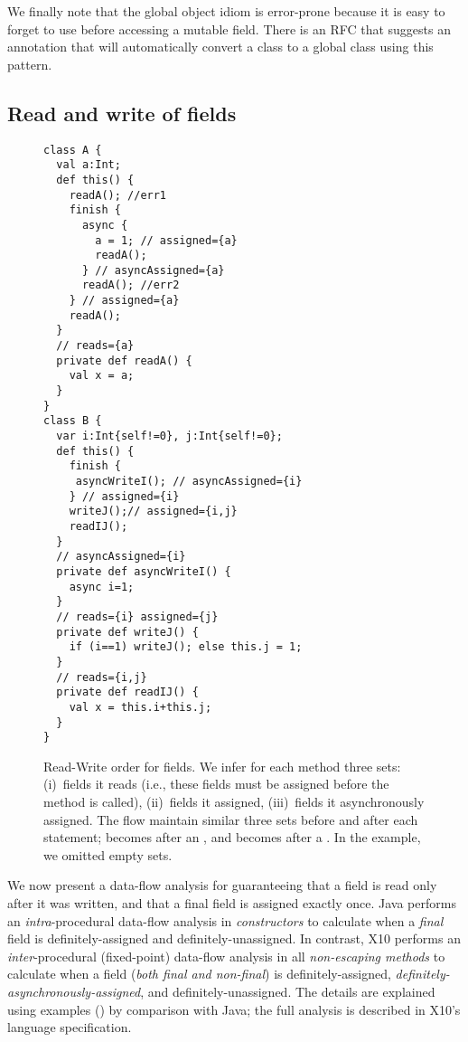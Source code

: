 We finally note that the global object idiom is error-prone because
    it is easy to forget to use  before accessing a mutable field.
There is an RFC that suggests an annotation that will automatically convert a class to a global class
    using this pattern.





\subsection{Read and write of fields}
\label{Section:Read-write-rules}


\begin{figure}
\begin{lstlisting}
class A {
  val a:Int;
  def this() {
    readA(); //err1
    finish {
      async {
        a = 1; // assigned={a}
        readA();
      } // asyncAssigned={a}
      readA(); //err2
    } // assigned={a}
    readA();
  }
  // reads={a}
  private def readA() {
    val x = a;
  }
}
class B {
  var i:Int{self!=0}, j:Int{self!=0};
  def this() {
    finish {
     asyncWriteI(); // asyncAssigned={i}
    } // assigned={i}
    writeJ();// assigned={i,j}
    readIJ();
  }
  // asyncAssigned={i}
  private def asyncWriteI() {
    async i=1;
  }
  // reads={i} assigned={j}
  private def writeJ() {
    if (i==1) writeJ(); else this.j = 1;
  }
  // reads={i,j}
  private def readIJ() {
    val x = this.i+this.j;
  }
}
\end{lstlisting}
\caption{Read-Write order for fields.
    We infer for each method three sets:
        (i)~fields it reads (i.e., these fields must be assigned before the method is called),
        (ii)~fields it assigned,
        (iii)~fields it asynchronously assigned.
    The flow maintain similar three sets before and after each statement;
         becomes  after an ,
        and  becomes  after a .
    In the example, we omitted empty sets.
    }
\label{Figure:Read-Write-Order}
\end{figure}

We now present a data-flow analysis for guaranteeing
    that a field is read only after it was written,
    and that a final field is assigned exactly once.
Java performs an \emph{intra}-procedural data-flow analysis in \emph{constructors} to calculate
    when a \emph{final} field is definitely-assigned and definitely-unassigned.
In contrast, X10 performs an \emph{inter}-procedural (fixed-point) data-flow analysis
    in all \emph{non-escaping methods} to calculate
    when {a} field (\emph{both final and non-final}) is
    definitely-assigned, \emph{definitely-asynchronously-assigned}, and definitely-unassigned.
The details are explained using examples () by comparison with Java;
    the full analysis is described in X10's language specification.

